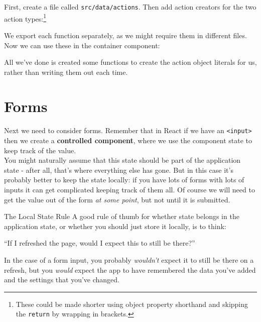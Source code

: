 First, create a file called \texttt{src/data/actions}. Then add action creators for the two action types:\footnote{These could be made shorter using object property shorthand and skipping the \texttt{return} by wrapping in brackets.}


We export each function separately, as we might require them in different files.
\\

Now we can use these in the container component:


All we've done is created some functions to create the action object literals for us, rather than writing them out each time.


\section{Forms}

Next we need to consider forms. Remember that in React if we have an \texttt{<input>} then we create a \textbf{controlled component}, where we use the component state to keep track of the value.
\\

You might naturally assume that this state should be part of the application state - after all, that's where everything else has gone. But in this case it's probably better to keep the state locally: if you have lots of forms with lots of inputs it can get complicated keeping track of them all. Of course we will need to get the value out of the form \textit{at some point}, but not until it is submitted.

\begin{infobox}{The Local State Rule}
    A good rule of thumb for whether state belongs in the application state, or whether you should just store it locally, is to think:

    \begin{center}
        ``If I refreshed the page, would I expect this to still be there?''
    \end{center}

    In the case of a form input, you probably \textit{wouldn't} expect it to still be there on a refresh, but you \textit{would} expect the app to have remembered the data you've added and the settings that you've changed.
\end{infobox}

